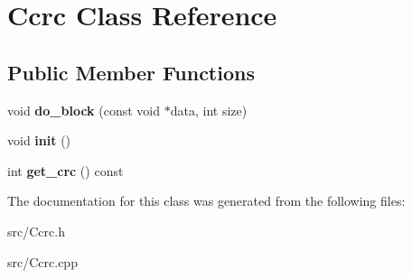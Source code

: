 \hypertarget{class_ccrc}{
\section{Ccrc Class Reference}
\label{class_ccrc}
}
\subsection*{Public Member Functions}
\begin{DoxyCompactItemize}
\item 
\hypertarget{class_ccrc_a15d9313add6cc90ccacef627ab51a6f0}{
void {\bfseries do\_\-block} (const void $\ast$data, int size)}
\label{class_ccrc_a15d9313add6cc90ccacef627ab51a6f0}

\item 
\hypertarget{class_ccrc_a2769dc32072e629d368f7e7d698c7821}{
void {\bfseries init} ()}
\label{class_ccrc_a2769dc32072e629d368f7e7d698c7821}

\item 
\hypertarget{class_ccrc_a92151c6618332105e9e0b383ec83561b}{
int {\bfseries get\_\-crc} () const }
\label{class_ccrc_a92151c6618332105e9e0b383ec83561b}

\end{DoxyCompactItemize}


The documentation for this class was generated from the following files:\begin{DoxyCompactItemize}
\item 
src/Ccrc.h\item 
src/Ccrc.cpp\end{DoxyCompactItemize}
